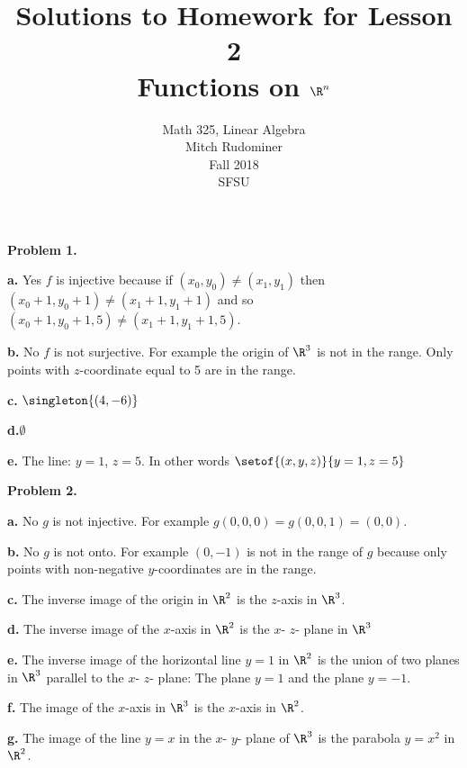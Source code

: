\documentclass[oneside,12pt]{amsart}
\begin{document}
\title{Solutions to Homework for Lesson 2 \\ Functions on $\R^n$}
\author{Math 325, Linear Algebra \\ Mitch Rudominer \\ Fall 2018 \\ SFSU }
\date{}

\maketitle


\textbf{Problem 1.}

\textbf{a.} Yes $f$ is injective because if $(x_0, y_0) \not= (x_1, y_1)$
then $(x_0 +1 , y_0 +1) \not= (x_1 +1 , y_1 +1)$ and so
 $(x_0 +1 , y_0 +1, 5) \not= (x_1 +1 , y_1 +1, 5)$.


\textbf{b.} No $f$ is not surjective. For example the origin of $\R^3$ is not in
the range. Only points with $z$-coordinate equal to 5 are in the range.



\textbf{c.} $\singleton{(4, -6)}$



\textbf{d.}$\emptyset$



\textbf{e.} The line: $y=1$, $z=5$. In other words $\setof{(x,y,z)}{y=1, z=5}$

\medskip

\textbf{Problem 2.}

\textbf{a.} No $g$ is not injective. For example
$g(0,0,0) = g(0, 0,1) = (0,0)$.


\textbf{b.} No $g$ is not onto. For example $(0, -1)$ is not in the range of
$g$ because only points with non-negative $y$-coordinates are in the range.


\textbf{c.} The inverse image of the origin in $\R^2$ is the $z$-axis in $\R^3$.


\textbf{d.} The inverse image of the $x$-axis in $\R^2$ is the $x$- $z$- plane
in $\R^3$

\textbf{e.} The inverse image of the horizontal line $y=1$ in $\R^2$ is
the union of two planes in $\R^3$ parallel to the $x$- $z$- plane: The
plane $y=1$ and the plane $y=-1$.

\textbf{f.} The image of the $x$-axis in $\R^3$ is the $x$-axis in $\R^2$.

\textbf{g.} The  image of the line $y=x$ in the $x$- $y$- plane
of $\R^3$ is the parabola $y=x^2$ in $\R^2$.


\medskip
\end{document}
